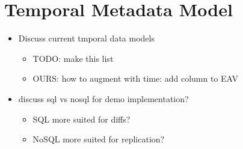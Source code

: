 \section{Temporal Metadata Model}

\begin{itemize}
\item Discuss current tmporal data models
    \begin{itemize}
    \item TODO: make this list
    \item OURS: how to augment with time: add column to EAV
    \end{itemize}
\item discuss sql vs nosql for demo implementation?
    \begin{itemize}
    \item SQL more suited for diffs?
    \item NoSQL more suited for replication?
    \end{itemize}
\end{itemize}
